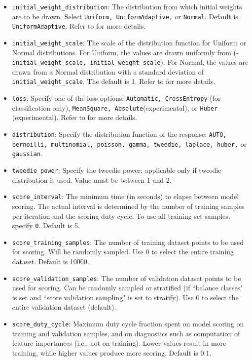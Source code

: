 \documentclass{article}[11pt]
\begin{document}
\begin{itemize}
\item \texttt{initial\_weight\_distribution}: The distribution from which initial weights are to be drawn. Select \texttt{Uniform, UniformAdaptive,} or \texttt{Normal}. Default is \texttt{UniformAdaptive}. Refer to  for more details.
\item \texttt{initial\_weight\_scale}: The scale of the distribution function for Uniform or Normal distributions. For Uniform, the values are drawn uniformly from (-\texttt{initial\_weight\_scale, initial\_weight\_scale}). For Normal, the values are drawn from a Normal distribution with a standard deviation of \texttt{initial\_weight\_scale}. The default is 1. Refer to  for more details.
\item \texttt{loss}: Specify one of the loss options: \texttt{Automatic, CrossEntropy} (for classification only), \texttt{MeanSquare, Absolute}(experimental), or \texttt{Huber} (experimental). Refer to  for more details.
\item \texttt{distribution}: Specify the distribution function of the response: \texttt{AUTO, bernoilli, multinomial, poisson, gamma, tweedie, laplace, huber,} or \texttt{gaussian}. 
\item \texttt{tweedie\_power}: Specify the tweedie power; applicable only if tweedie distribution is used. Value must be between 1 and 2. 
\item \texttt{score\_interval}: The minimum time (in seconds) to elapse between model scoring. The actual interval is determined by the number of training samples per iteration and the scoring duty cycle. To use all training set samples, specify \texttt{0}. Default is 5.
\item \texttt{score\_training\_samples}: The number of training dataset points to be used for scoring. Will be randomly sampled. Use 0 to select the entire training dataset. Default is 10000.
\item \texttt{score\_validation\_samples}: The number of validation dataset points to be used for scoring. Can be randomly sampled or stratified (if ``balance classes" is set and ``score validation sampling" is set to stratify). Use 0 to select the entire validation dataset (default).
\item \texttt{score\_duty\_cycle}: Maximum duty cycle fraction spent on model scoring on training and validation samples, and on diagnostics such as computation of feature importances (i.e., not on training). Lower values result in more training, while higher values produce more scoring. Default is 0.1.

\end{itemize}
\end{document}
